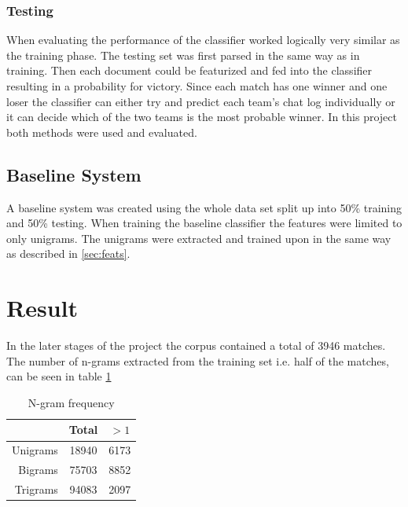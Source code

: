 \documentclass[12pt,a4paper]{article}
\begin{document}
\subsubsection{Testing}
When evaluating the performance of the classifier worked logically very similar as the training phase.
The testing set was first parsed in the same way as in training.
Then each document could be featurized and fed into the classifier resulting in a probability for victory.
Since each match has one winner and one loser the classifier can either try and predict each team's chat log individually
or it can decide which of the two teams is the most probable winner.
In this project both methods were used and evaluated.

\subsection{Baseline System}
A baseline system was created using the whole data set split up into 50\% training and 50\% testing.
When training the baseline classifier the features were limited to only unigrams.
The unigrams were extracted and trained upon in the same way as described in \ref{sec:feats}.

\section{Result}
In the later stages of the project the corpus contained a total of 3946 matches.
The number of n-grams extracted from the training set i.e. half of the matches,
can be seen in table \ref{tab:n-grams}

\begin{table}[h]
    \begin{center}
        \begin{tabular}{r | c c}
                        & Total & $>1$   \\
            \hline
            Unigrams    & 18940 & 6173 \\
            Bigrams     & 75703 & 8852 \\
            Trigrams    & 94083 & 2097 \\
        \end{tabular}
        \caption{N-gram frequency}
        \label{tab:n-grams}
    \end{center}
\end{table}
\end{document}
